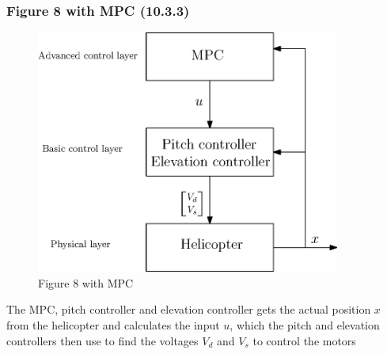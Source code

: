 \subsubsection{Figure 8 with MPC (10.3.3)}
\begin{figure}[H]
	\centering
	\includegraphics[width=10cm]{figurate_with_MPC}
	\caption{Figure 8 with MPC}
	\label{fig:figurate}
\end{figure}

The MPC, pitch controller and elevation controller gets the actual position $x$ from the helicopter and calculates the input $u$, which the pitch and elevation controllers then use to find the voltages $V_d$ and $V_s$ to control the motors
